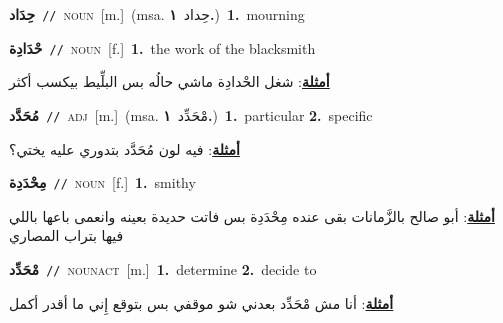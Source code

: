 \documentclass[10pt,a4paper,twoside]{article} %
\begin{document}
\begin{multicols}{2}
{\setlength\topsep{0pt}\textbf{\foreignlanguage{arabic}{حِدَاد}}\ {\color{gray}\texttt{//}\color{black}}\ \textsc{noun}\ [m.]\ \color{gray}(msa. \foreignlanguage{arabic}{حِداد}~\foreignlanguage{arabic}{\textbf{١.}})\color{black}\ \textbf{1.}~mourning\ } \vspace{2mm}

{\setlength\topsep{0pt}\textbf{\foreignlanguage{arabic}{حْدَادِة}}\ {\color{gray}\texttt{//}\color{black}}\ \textsc{noun}\ [f.]\ \textbf{1.}~the work of the blacksmith\  \begin{flushright}\color{gray}\foreignlanguage{arabic}{\textbf{\underline{\foreignlanguage{arabic}{أمثلة}}}: شغل الحْدادِة ماشي حالُه بس البلِّيط بيكسب أكثر}\end{flushright}\color{black}} \vspace{2mm}

{\setlength\topsep{0pt}\textbf{\foreignlanguage{arabic}{مُحَدَّد}}\ {\color{gray}\texttt{//}\color{black}}\ \textsc{adj}\ [m.]\ \color{gray}(msa. \foreignlanguage{arabic}{مْحَدِّد}~\foreignlanguage{arabic}{\textbf{١.}})\color{black}\ \textbf{1.}~particular  \textbf{2.}~specific\  \begin{flushright}\color{gray}\foreignlanguage{arabic}{\textbf{\underline{\foreignlanguage{arabic}{أمثلة}}}: فيه لون مُحَدَّد بتدوري عليه يختي؟}\end{flushright}\color{black}} \vspace{2mm}

{\setlength\topsep{0pt}\textbf{\foreignlanguage{arabic}{مِحْدَدِة}}\ {\color{gray}\texttt{//}\color{black}}\ \textsc{noun}\ [f.]\ \textbf{1.}~smithy\  \begin{flushright}\color{gray}\foreignlanguage{arabic}{\textbf{\underline{\foreignlanguage{arabic}{أمثلة}}}: أبو صالح بالزَّمانات بقى عنده مِحْدَدِة بس فاتت حديدة بعينه وانعمى باعها باللي فيها بتراب المصاري}\end{flushright}\color{black}} \vspace{2mm}

{\setlength\topsep{0pt}\textbf{\foreignlanguage{arabic}{مْحَدِّد}}\ {\color{gray}\texttt{//}\color{black}}\ \textsc{noun\textunderscore act}\ [m.]\ \textbf{1.}~determine  \textbf{2.}~decide to\  \begin{flushright}\color{gray}\foreignlanguage{arabic}{\textbf{\underline{\foreignlanguage{arabic}{أمثلة}}}: أنا مش مْحَدِّد بعدني شو موقفي بس بتوقع إِني ما أقدر أكمل}\end{flushright}\color{black}} \vspace{2mm}


\end{multicols}
\end{document}
